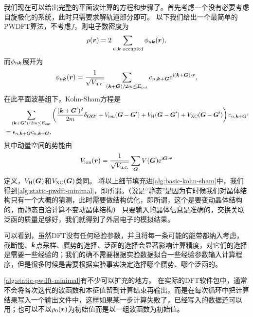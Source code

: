 我们现在可以给出完整的平面波计算的方程和步骤了。首先考虑一个没有必要考虑自旋极化的系统，此时只需要求解轨道部分即可。
以下我们给出一个最简单的PWDFT算法，不考虑$f$，则电子数密度为
\begin{equation}
    \rho(\vb*{r}) = 2 \sum_{n, \vb*{k} \text{ occupied}}  \phi_{n \vb*{k}}(\vb*{r}),
    \label{eq:kohn-sham-density-pw-minimal}
\end{equation}
而$\phi_{n \vb*{k}}$展开为
\begin{equation}
    \phi_{n \vb*{k}}(\vb*{r}) = \frac{1}{\sqrt{V_\text{u.c.}}} \sum_{(\vb*{k} + \vb*{G}) / 2m \leq E_\text{cut}} c_{n, \vb*{k} + \vb*{G}} \mathrm{e}^{\mathrm{i} (\vb*{k} + \vb*{G}) \cdot \vb*{r}},
    \label{eq:pw-minimal-expand}
\end{equation}
在此平面波基组下，Kohn-Sham方程是
\begin{equation}
    \begin{aligned}
        &\quad \sum_{( \vb*{k} + \vb*{G}') / 2m \leq E_\text{cut} } \left( \frac{(\vb*{k} + \vb*{G}') ^2}{2m} \delta_{\vb*{G} \vb*{G}'} + V_\text{ion}(\vb*{G} - \vb*{G}') + V_\text{H}(\vb*{G} - \vb*{G}') + V_\text{XC}(\vb*{G} - \vb*{G}') \right) c_{n, \vb*{k} + \vb*{G}'} \\
        &= \epsilon_{n, \vb*{k} + \vb*{G}} c_{n, \vb*{k} + \vb*{G}},
    \end{aligned}
    \label{eq:kohn-sham-eq-pw-minimal}
\end{equation}
其中动量空间的势能由
\begin{equation}
    V_\text{ion}(\vb*{r}) = \frac{1}{\sqrt{V_\text{u.c.}}} \sum_{\vb*{G}} V(\vb*{G}) \mathrm{e}^{\mathrm{i} \vb*{G} \cdot \vb*{r}}
    \label{eq:momentum-space-potential-dft}
\end{equation}
定义，$V_\text{H}(\vb*{G})$和$V_\text{XC}(\vb*{G})$类同。
将以上细节填充进\autoref{alg:basic-kohn-sham}中，我们得到\autoref{alg:static-pwdft-minimal}，即所谓。（说是“静态”是因为有时候我们对晶体结构只有一个大概的猜测，此时需要做结构优化，即所谓，这个是要变动晶体结构的，而静态自洽计算不变动晶体结构）
只要输入的晶体信息是准确的，交换关联泛函的质量足够好，我们就得到了外层电子的模拟结果。

可以看到，虽然DFT没有任何经验参数，并且将每一条可能的能带都纳入考虑，截断能、$\vb*{k}$点采样、赝势的选择、泛函的选择会显著影响计算精度，对它们的选择是需要一些经验的；我们的确不需要根据实验数据拟合一些经验参数输入计算程序，但是很多时候是需要根据实验事实决定选择哪个赝势、哪个泛函的。

\autoref{alg:static-pwdft-minimal}有不少可以扩充的地方。
在实际的DFT软件包中，通常不会将各次迭代的波函数和本征值留到计算结束再输出，而是在每次循环中把计算结果写入一个输出文件中，这样如果某一步计算失败了，已经写入的数据还可以用；也可以不以$\rho_0(\vb*{r})$为初始值而是以一组波函数为初始值。

